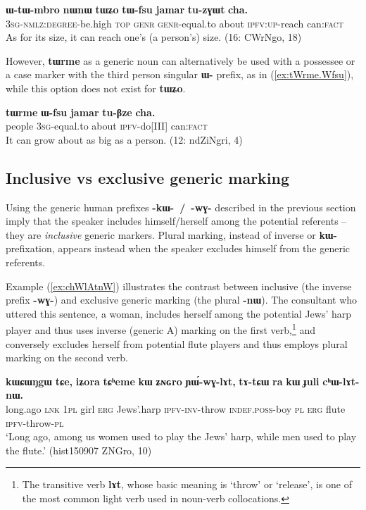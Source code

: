\documentclass[oneside,a4paper,11pt]{article}
\newcommand{\ipa}[1]{\textbf{\phon\mbox{#1}}} %
\newcommand{\refb}[1]{(\ref{#1})}
\begin{document}
\begin{exe}
\ex  \label{ex:tWZo.tWfsu}
\gll
\ipa{ɯ-tɯ-mbro} 	\ipa{nɯnɯ} 	\ipa{tɯʑo} 	\ipa{tɯ-fsu} 	\ipa{jamar} 	\ipa{tu-zɣɯt} 	\ipa{cha.}  \\
\textsc{3sg-nmlz:degree}-be.high \textsc{top} \textsc{genr} \textsc{genr}-equal.to about \textsc{ipfv:up}-reach can:\textsc{fact} \\
\glt As for its size, it can reach one's (a person's) size. (16: CWrNgo, 18)
\end{exe}

However, \ipa{tɯrme} as a generic noun can alternatively be used with a possessee or a case marker with the third person singular \ipa{ɯ-} prefix, as in \refb{ex:tWrme.Wfsu}, while this option does not exist for \ipa{tɯʑo}.

\begin{exe}
\ex  \label{ex:tWrme.Wfsu}
\gll
 	\ipa{tɯrme} 	\ipa{ɯ-fsu} 	\ipa{jamar} 	\ipa{tu-βze} 	\ipa{cha.} \\
people \textsc{3sg}-equal.to about \textsc{ipfv}-do[III] can:\textsc{fact} \\
\glt It can grow about as big as a person. (12: ndZiNgri, 4)
\end{exe}


\subsection{Inclusive vs exclusive generic marking} \label{sec:exclusive}
Using the generic human prefixes \ipa{-kɯ- / -wɣ-} described in the previous section imply that the speaker includes himself/herself among the potential referents -- they are \textit{inclusive} generic markers. Plural marking, instead of inverse or \ipa{kɯ-} prefixation, appears instead when the speaker excludes himself from the generic referents. 

Example \refb{ex:chWlAtnW} illustrates the contrast between inclusive (the inverse prefix \ipa{-wɣ-}) and exclusive generic marking (the plural \ipa{-nɯ}). The consultant who uttered this sentence, a woman, includes herself among the potential Jews' harp player and thus uses inverse (generic A) marking on the first verb,\footnote{The transitive verb \ipa{lɤt}, whose basic meaning is `throw' or `release', is one of the most common light verb used in noun-verb collocations.} and conversely excludes herself from potential flute players and thus employs plural marking on the second verb. 

\begin{exe}
\ex \label{ex:chWlAtnW}
 \gll  \ipa{kɯɕɯŋgɯ} 	\ipa{tɕe,} 	\ipa{iʑora} 	\ipa{tɕʰeme} 	\ipa{kɯ} 	\ipa{ʑɴɢro} 	\ipa{ɲɯ́-wɣ-lɤt,} 	\ipa{tɤ-tɕɯ} 	\ipa{ra} 	\ipa{kɯ} 	\ipa{ɟuli} 	\ipa{cʰɯ-lɤt-nɯ.} \\
 long.ago \textsc{lnk} \textsc{1pl} girl  \textsc{erg} Jews'.harp \textsc{ipfv-inv}-throw \textsc{indef.poss}-boy \textsc{pl} \textsc{erg} flute \textsc{ipfv}-throw-\textsc{pl}  \\
 \glt `Long ago, among us women used to play the Jews' harp, while men used to play the flute.' (hist150907 ZNGro, 10)
\end{exe}
 
\end{document}
